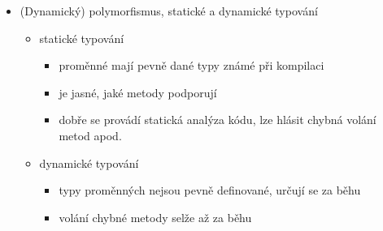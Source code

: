 \begin{itemize}
\begin{itemize}
\item viditelnost v C\# - některá klíčová slova
\begin{itemize}
\item public - přístup není omezen
\item private - přístup je omezen na kód v daném typu
\begin{itemize}
\item C\# podporuje vnořené typy - takže kód ve vnořeném typu má taky přístup k private položkám typu, v němž je vnořen
\end{itemize}
\item protected - přístup je omezen na daný typ a typy, které z něj dědí
\end{itemize}
\item výchozí viditelnost - private ve třídě, public v interfacu
\item C\#: abstract method vs. interface
\begin{itemize}
\item vynucení kontraktu - interface ho vynucuje hned
\item veřejný kontrakt - abstraktní metody můžou být protected
\item slib rozšiřitelnosti - u virtuální metody je to opt-out (pomocí sealed), u interfaců opt-in (musím znova říct, že implementuju interface)
\item data - u interfaců nelze (kvůli vícenásobné dědičnosti)
\item vícenásobná dědičnost - nelze u abstraktních metod
\end{itemize}
\end{itemize}
\item (Dynamický) polymorfismus, statické a dynamické typování
\begin{itemize}
\item statické typování
\begin{itemize}
\item proměnné mají pevně dané typy známé při kompilaci
\item je jasné, jaké metody podporují
\item dobře se provádí statická analýza kódu, lze hlásit chybná volání metod apod.
\end{itemize}
\item dynamické typování
\begin{itemize}
\item typy proměnných nejsou pevně definované, určují se za běhu
\item volání chybné metody selže až za běhu

\end{itemize}
\end{itemize}
\end{itemize}
